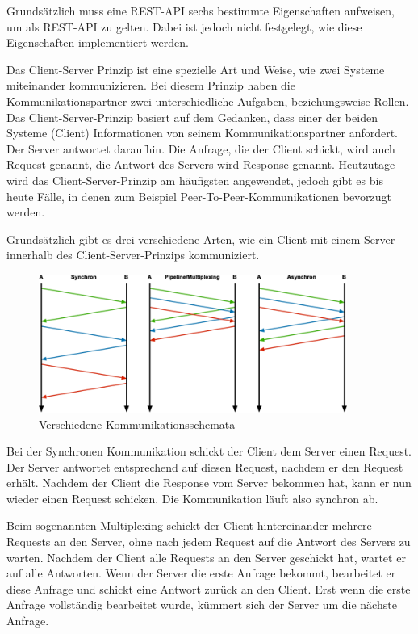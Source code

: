 
Grundsätzlich muss eine REST-API sechs bestimmte Eigenschaften aufweisen, um als REST-API zu gelten. Dabei ist jedoch nicht festgelegt, wie diese Eigenschaften implementiert werden. \cite{RedHatRest}


Das Client-Server Prinzip ist eine spezielle Art und Weise, wie zwei Systeme miteinander kommunizieren. Bei diesem Prinzip haben die Kommunikationspartner zwei unterschiedliche Aufgaben, beziehungsweise Rollen. Das Client-Server-Prinzip basiert auf dem Gedanken, dass einer der beiden Systeme (Client) Informationen von seinem Kommunikationspartner anfordert. Der Server antwortet daraufhin. Die Anfrage, die der Client schickt, wird auch Request genannt, die Antwort des Servers wird Response genannt. Heutzutage wird das Client-Server-Prinzip am häufigsten angewendet, jedoch gibt es bis heute Fälle, in denen zum Beispiel Peer-To-Peer-Kommunikationen bevorzugt werden.

Grundsätzlich gibt es drei verschiedene Arten, wie ein Client mit einem Server innerhalb des Client-Server-Prinzips kommuniziert. 

\begin{figure}[H]
    \centering
    \includegraphics[width=0.9\textwidth]{media/REST/ClientServer.png}
    \caption{Verschiedene Kommunikationsschemata \cite{ClientServer}}
\end{figure}

Bei der Synchronen Kommunikation schickt der Client dem Server einen Request. Der Server antwortet entsprechend auf diesen Request, nachdem er den Request erhält. Nachdem der Client die Response vom Server bekommen hat, kann er nun wieder einen Request schicken. Die Kommunikation läuft also synchron ab.

Beim sogenannten Multiplexing schickt der Client hintereinander mehrere Requests an den Server, ohne nach jedem Request auf die Antwort des Servers zu warten. Nachdem der Client alle Requests an den Server geschickt hat, wartet er auf alle Antworten. Wenn der Server die erste Anfrage bekommt, bearbeitet er diese Anfrage und schickt eine Antwort zurück an den Client. Erst wenn die erste Anfrage vollständig bearbeitet wurde, kümmert sich der Server um die nächste Anfrage.

